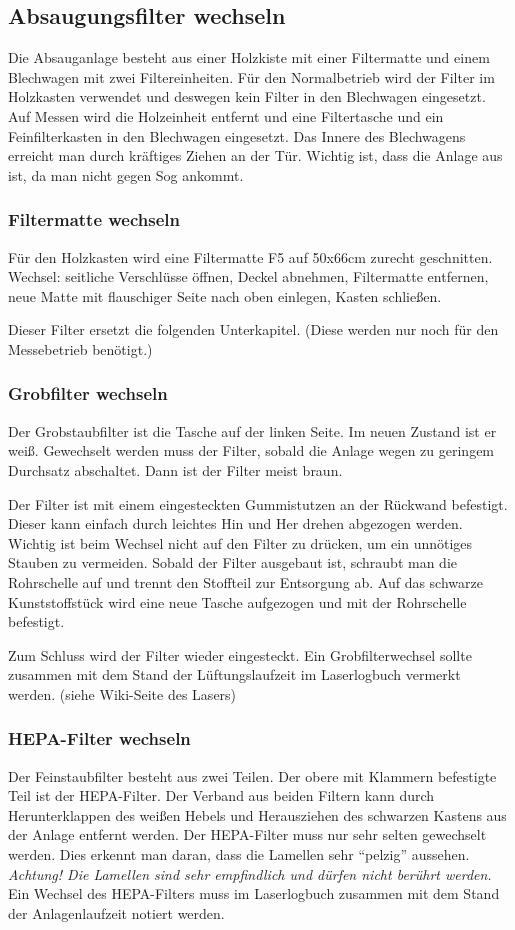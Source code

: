 \documentclass{\basedir/fablab-document}
\renewcommand{\todo}[1]{\textbf{\color{red}{TODO: #1}}}
\begin{document}
\subsection{Absaugungsfilter wechseln}
\todo{Beschreibung ist veraltet}
Die Absauganlage besteht aus einer Holzkiste mit einer Filtermatte und einem Blechwagen mit zwei Filtereinheiten. Für den Normalbetrieb wird der Filter im Holzkasten verwendet und deswegen kein Filter in den Blechwagen eingesetzt. Auf Messen wird die Holzeinheit entfernt und eine Filtertasche und ein Feinfilterkasten in den Blechwagen eingesetzt. Das Innere des Blechwagens erreicht man durch kräftiges Ziehen an der Tür. Wichtig ist, dass die Anlage aus ist, da man nicht gegen Sog ankommt.
\subsubsection{Filtermatte wechseln}
Für den Holzkasten wird eine Filtermatte F5 auf 50x66cm zurecht geschnitten.
Wechsel: seitliche Verschlüsse öffnen, Deckel abnehmen, Filtermatte entfernen, neue Matte mit flauschiger Seite nach oben einlegen, Kasten schließen.

Dieser Filter ersetzt die folgenden Unterkapitel. (Diese werden nur noch für den Messebetrieb benötigt.)
\subsubsection{Grobfilter wechseln}
Der Grobstaubfilter ist die Tasche auf der linken Seite. Im neuen Zustand ist er weiß. Gewechselt werden muss der Filter, sobald die Anlage wegen zu geringem Durchsatz abschaltet. Dann ist der Filter meist braun.

Der Filter ist mit einem eingesteckten Gummistutzen an der Rückwand befestigt. Dieser kann einfach durch leichtes Hin und Her drehen abgezogen werden. Wichtig ist beim Wechsel nicht auf den Filter zu drücken, um ein unnötiges Stauben zu vermeiden. Sobald der Filter ausgebaut ist, schraubt man die Rohrschelle auf und trennt den Stoffteil zur Entsorgung ab. Auf das schwarze Kunststoffstück wird eine neue Tasche aufgezogen und mit der Rohrschelle befestigt.

Zum Schluss wird der Filter wieder eingesteckt. Ein Grobfilterwechsel sollte zusammen mit dem Stand der Lüftungslaufzeit im Laserlogbuch vermerkt werden. (siehe Wiki-Seite des Lasers)
\subsubsection{HEPA-Filter wechseln}
\label{subsubsec:HEPA-Filter}
Der Feinstaubfilter besteht aus zwei Teilen. Der obere mit Klammern befestigte Teil ist der HEPA-Filter. Der Verband aus beiden Filtern kann durch Herunterklappen des weißen Hebels und Herausziehen des schwarzen Kastens aus der Anlage entfernt werden.
Der HEPA-Filter muss nur sehr selten gewechselt werden. Dies erkennt man daran, dass die Lamellen sehr \enquote{pelzig} aussehen. \emph{Achtung! Die Lamellen sind sehr empfindlich und dürfen nicht berührt werden.}
Ein Wechsel des HEPA-Filters muss im Laserlogbuch zusammen mit dem Stand der Anlagenlaufzeit notiert werden.
\end{document}
